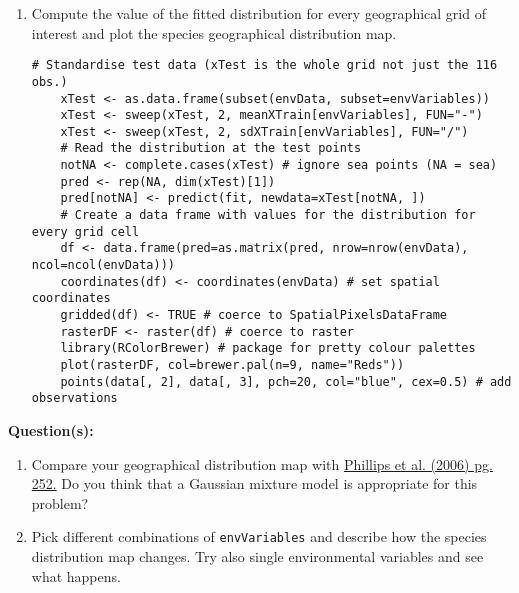 \documentclass[a4paper,11pt]{article}
\begin{document}
\begin{enumerate}
	\item Compute the value of the fitted distribution for every geographical grid of interest and plot the species geographical distribution map.
	\\
	\begin{lstlisting}[style=RCode]
	# Standardise test data (xTest is the whole grid not just the 116 obs.)
	xTest <- as.data.frame(subset(envData, subset=envVariables)) 
	xTest <- sweep(xTest, 2, meanXTrain[envVariables], FUN="-")
	xTest <- sweep(xTest, 2, sdXTrain[envVariables], FUN="/")
	# Read the distribution at the test points
	notNA <- complete.cases(xTest) # ignore sea points (NA = sea) 
	pred <- rep(NA, dim(xTest)[1])
	pred[notNA] <- predict(fit, newdata=xTest[notNA, ])
	# Create a data frame with values for the distribution for every grid cell
	df <- data.frame(pred=as.matrix(pred, nrow=nrow(envData), ncol=ncol(envData)))
	coordinates(df) <- coordinates(envData) # set spatial coordinates
	gridded(df) <- TRUE # coerce to SpatialPixelsDataFrame
	rasterDF <- raster(df) # coerce to raster
	library(RColorBrewer) # package for pretty colour palettes
	plot(rasterDF, col=brewer.pal(n=9, name="Reds"))
	points(data[, 2], data[, 3], pch=20, col="blue", cex=0.5) # add observations
	\end{lstlisting}
	\vspace{-0.6cm}

\end{enumerate}

\begin{framed}
\textbf{Question(s):}
\begin{enumerate}
	\item Compare your geographical distribution map with \href{http://www.cs.princeton.edu/~schapire/papers/ecolmod.pdf}{Phillips et al. (2006) pg. 252.} 
	Do you think that a Gaussian mixture model is appropriate for this problem?
	\item Pick different combinations of \texttt{envVariables} and describe how the species distribution map changes. Try also single environmental variables
	and see what happens.
\end{enumerate}
\end{framed}

\clearpage

\end{document}
